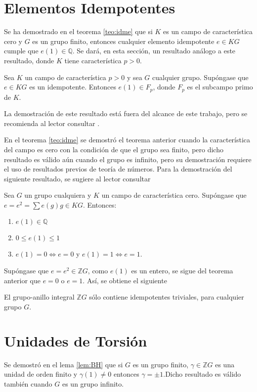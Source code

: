 \section{\quad Elementos Idempotentes}
Se ha demostrado en el teorema \ref{teo:idme} que si $K$ es un campo de característica cero y $G$ es un grupo finito, entonces cualquier elemento idempotente $e \in KG$ cumple que $e(1) \in \mathds{Q}$. Se dará, en esta sección, un resultado análogo a este resultado, donde $K$ tiene característica $p > 0$.

\begin{teorema}\label{teo:genidem}
Sea $K$ un campo de característica $p > 0$ y sea $G$ cualquier grupo. Supóngase que $e \in KG$ es un idempotente. Entonces $e(1) \in F_p$, donde $F_p$ es el subcampo primo de $K$. 
\end{teorema}

La demostración de este resultado está fuera del alcance de este trabajo, pero se recomienda al lector consultar \cite{bib:passman}. 

En el teorema \ref{teo:idme} se demostró el teorema anterior cuando la característica del campo es cero con la condición de que el grupo sea finito, pero dicho resultado es válido aún cuando el grupo es infinito, pero su demostración requiere el uso de resultados previos de teoría de números. Para la demostración del siguiente resultado, se sugiere al lector consultar \cite{bib:passman}

\begin{teorema}\label{teo:genidem23}
Sea $G$ un grupo cualquiera y $K$ un campo de característica cero. Supóngase que $e = e^2 = \sum e(g)g \in KG$. Entonces:
\begin{enumerate}
\item $e(1) \in \mathds{Q}$
\item $0\leq e(1) \leq 1$
\item $e(1) = 0 \Leftrightarrow e= 0 $ y $e(1) = 1 \Leftrightarrow e = 1$. 
\end{enumerate}
\end{teorema} 

Supóngase que $e = e^2 \in \mathds{Z}G$, como $e(1)$ es un entero, se sigue del teorema anterior que $e = 0$ o $e = 1$. Así, se obtiene el siguiente
\begin{corolario}
El grupo-anillo integral $\mathds{Z}G$ sólo contiene idempotentes triviales, para cualquier grupo $G$.
\end{corolario}

\section{\quad Unidades de Torsión}
Se demostró en el lema \ref{lem:BH} que si $G$ es un grupo finito, $\gamma \in \mathds{Z}G$ es una unidad de orden finito y $\gamma(1) \neq 0$ entonces $\gamma = \pm 1$.Dicho resultado es válido también cuando $G$ es un grupo infinito. 

